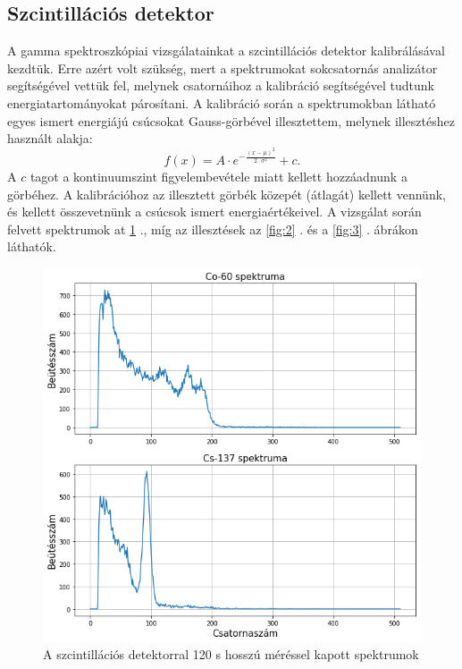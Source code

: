 \documentclass[12pt,a4paper]{article}
\begin{document}
\subsection{Szcintillációs detektor}
\hspace*{10pt} A gamma spektroszkópiai vizsgálatainkat a szcintillációs detektor kalibrálásával kezdtük. Erre azért volt szükség, mert a spektrumokat sokcsatornás analizátor segítségével vettük fel, melynek csatornáihoz a kalibráció segítségével tudtunk energiatartományokat párosítani. A kalibráció során a spektrumokban látható egyes ismert energiájú csúcsokat Gauss-görbével illesztettem, melynek illesztéshez használt alakja:
$$f(x)=A\cdot e^{-\frac{(x-\mu)^2}{2\cdot \sigma ^2}} + c  .$$
A $c$ tagot a kontinuumszint figyelembevétele miatt kellett hozzáadnunk a görbéhez. A kalibrációhoz az illesztett görbék közepét (átlagát) kellett vennünk, és kellett összevetnünk a csúcsok ismert energiaértékeivel. A vizsgálat során felvett spektrumok at \ref{fig:1} ., míg az illesztések az \ref{fig:2} . és a \ref{fig:3} . ábrákon láthatók.\\
\begin{figure}[!h]
\centering
\includegraphics[scale=0.60]{szc_spekt}
\caption{A szcintillációs detektorral 120 s hosszú méréssel kapott spektrumok}
\label{fig:1}
\end{figure}
\newpage
\end{document}

